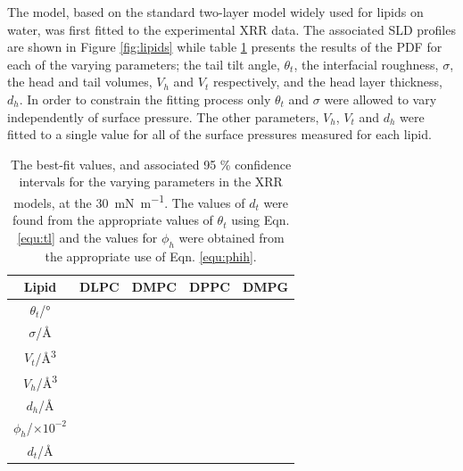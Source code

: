 \documentclass[%
 reprint,
 amsmath,amssymb,
 prl,
]{revtex4-1}
\begin{document}
The model, based on the standard two-layer model widely used for lipids on water, was first fitted to the experimental XRR data.
The associated SLD profiles are shown in Figure \ref{fig:lipids} while table \ref{tab:liptab} presents the results of the PDF for each of the varying parameters; the tail tilt angle, $\theta_t$, the interfacial roughness, $\sigma$, the head and tail volumes, $V_h$ and $V_t$ respectively, and the head layer thickness, $d_h$.
In order to constrain the fitting process only $\theta_t$ and $\sigma$ were allowed to vary independently of surface pressure. The other parameters, $V_h$, $V_t$ and $d_h$ were fitted to a single value for all of the surface pressures measured for each lipid.

%
\begin{table}
	\caption{\label{tab:liptab} The best-fit values, and associated 95 \% confidence intervals for the varying parameters in the XRR models, at the \SI{30}{\milli\newton\per\meter}. The values of $d_t$ were found from the appropriate values of $\theta_t$ using Eqn. \ref{equ:tl} and the values for $\phi_h$ were obtained from the appropriate use of Eqn. \ref{equ:phih}.}
  \begin{ruledtabular}
	\begin{tabular}{ccccc}
    Lipid & DLPC & DMPC & DPPC & DMPG \\
    \hline
    $\theta_t$/\si{\degree} &  &  &  &  \\
    $\sigma$/\si{\angstrom} &  &  &  &  \\
    \hline
    $V_t$/\si{\cubic\angstrom} &  &  &  &  \\
    $V_h$/\si{\cubic\angstrom} &  &  &  &  \\
    $d_h$/\si{\angstrom} &  &  &  &  \\
    \hline
    $\phi_h$/$\times10^{-2}$ &  &  &  &  \\
    $d_t$/\si{\angstrom} &  &  &  &  \\
	\end{tabular}
  \end{ruledtabular}
\end{table}
%
\end{document}
